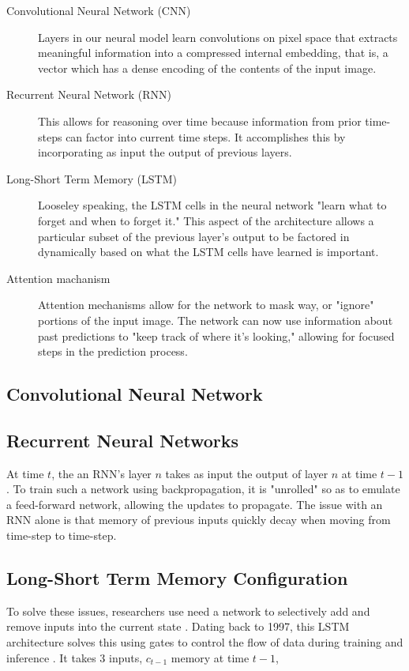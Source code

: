 \documentclass[12pt]{article}
\begin{document}
\begin{description}
  \item[Convolutional Neural Network (CNN)] Layers in our neural model learn
  convolutions on pixel space that extracts meaningful information into a
  compressed internal embedding, that is, a vector which has a dense encoding of
  the contents of the input image.
  \item[Recurrent Neural Network (RNN)] This allows for reasoning over time
  because information from prior time-steps can factor into current time steps.
  It accomplishes this by incorporating as input the output of previous layers.
  \item[Long-Short Term Memory (LSTM)] Looseley speaking, the LSTM cells in the
  neural network "learn what to forget and when to forget it." This aspect of
  the architecture allows a particular subset of the previous layer's output to
  be factored in dynamically based on what the LSTM cells have learned is
  important.
  \item[Attention machanism] Attention mechanisms allow for the network to mask
  way, or "ignore" portions of the input image. The network can now use
  information about past predictions to "keep track of where it's looking," allowing
  for focused steps in the prediction process.
\end{description}

\subsection{Convolutional Neural Network}

\subsection{Recurrent Neural Networks}

At time $t$, the an RNN's layer $n$ takes as input the output of layer $n$ at
time $t-1$. To train such a network using backpropagation, it is "unrolled" so
as to emulate a feed-forward network, allowing the updates to propagate. The
issue with an RNN alone is that memory of previous inputs quickly decay when
moving from time-step to time-step. 

\subsection{Long-Short Term Memory Configuration}

To solve these issues, researchers use need a network to selectively add and
remove inputs into the current state \parencite{zhang2019dive}. Dating back to
1997, this LSTM architecture solves this using gates to control the flow of data
during training and inference \parencite{zhang2019dive}. It takes 3 inputs,
$c_{t-1}$ memory at time $t-1$, %
\end{document}
